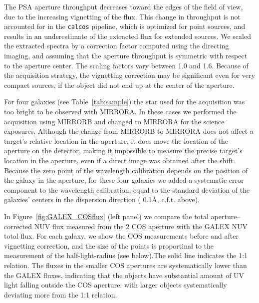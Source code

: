 \documentclass[manuscript]{emulateapj}
\begin{document}
The PSA aperture throughput decreases toward the edges of the field of
view, due to the increasing vignetting of the flux. This change in
throughput is not accounted for in the {\tt calcos} pipeline, which is
optimized for point sources, and results in an underestimate of the
extracted flux for extended sources. We scaled the extracted spectra
by a correction factor computed using the directing imaging, and
assuming that the aperture throughput is symmetric with respect to the
aperture center. The scaling factors vary between 1.0 and 1.6. Because
of the acquisition strategy, the vignetting correction may be
significant even for very compact sources, if the object did not end
up at the center of the aperture. 

For four galaxies (see Table~\ref{tab:sample}) the star used for the
acquisition was too bright to be observed with MIRRORA. In these cases
we performed the acquisition using MIRRORB and changed to MIRRORA for the
science exposures. Although the change from MIRRORB to MIRRORA does not
affect a target's relative location in the aperture, it does move the
location of the aperture on the detector, making it impossible to measure
the precise target's location in the aperture, even if a direct image
was obtained after the shift. Because the zero point of the wavelength
calibration depends on the position of the galaxy in the aperture, for
these four galaxies we added a systematic error component to the
wavelength calibration, equal to the standard deviation of the
galaxies' centers in the dispersion direction ( 0.1\AA, c.f.t. above).

In Figure~\ref{fig:GALEX_COSflux} (left panel) we compare the total
aperture--corrected NUV flux measured from the 2 COS aperture
with the GALEX NUV total flux. For each galaxy, we show the COS
measurements before and after vignetting correction, and the size of
the points is proportinal to the measurement of the half-light-radius
(see below).The solid line indicates the 1:1 relation. The fluxes in
the smaller COS apertures are systematically lower than the GALEX
fluxes, indicating that the objects have substantial amount of UV
light falling outside the COS aperture, with larger objects
systematically deviating more from the 1:1 relation.
\end{document}

